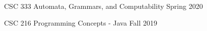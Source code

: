 \begin{cvhonors}

  \cvgta
    {} %
    {\footnotesize CSC 333 Automata, Grammars, and Computability} %
    {} %
    {\footnotesize Spring 2020} %

  \cvgta
    {} %
    {\footnotesize CSC 216 Programming Concepts - Java} %
    {} %
    {\footnotesize Fall 2019} %

\end{cvhonors}

